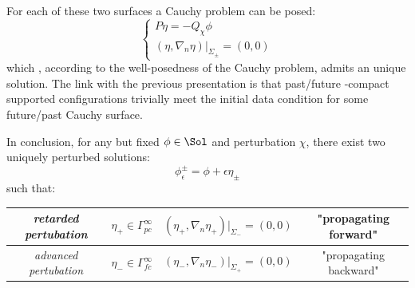 \documentclass[Main]{subfiles}
\begin{document}
		For each of these two surfaces a Cauchy problem can be posed:
		\begin{equation}\label{PerturbationCauchyProblem}
		   \begin{cases}
			   P \eta = - Q_\chi \phi \\
			   (\eta, \nabla_n \eta ) \big \vert_{\Sigma_{\pm}} = (0,0)
   			\end{cases}
   		\end{equation}
   		which , according to the well-posedness of the Cauchy problem, admits an unique solution.
   		The link with the previous presentation is that past/future -compact supported configurations trivially meet the initial data condition for some future/past Cauchy surface.
		
		\vspace{2mm}
		In conclusion, for any but fixed $\phi\in \Sol$ and perturbation $\chi$, there exist two uniquely perturbed solutions:
   		\begin{equation}\label{PerturbedSolution}
   			\phi^\pm_\epsilon = \phi + \epsilon \eta_\pm
   		\end{equation}
   		such that:
 		\begin{center}   \begin{tabular}{|c|c|c|c|}
   		\hline
  	 		\emph{retarded pertubation} & $\eta_+ \in \Gamma^\infty_{pc}$ & $(\eta_+, \nabla_n \eta_+ ) \big \vert_{\Sigma_{-}} = (0,0)$ & "propagating forward" \\
  	 		\hline
   			\emph{advanced pertubation} &$\eta_- \in \Gamma^\infty_{fc}$ & $(\eta_-, \nabla_n \eta_- ) \big \vert_{\Sigma_{+}} = (0,0)$ & "propagating backward" \\
   			\hline
   		\end{tabular}	\end{center} 	
		
			
   		
\end{document}

